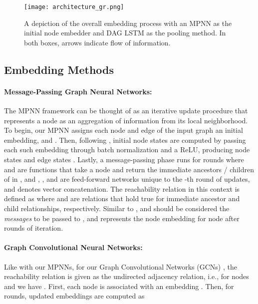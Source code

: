 \documentclass{article}
\begin{document}
\begin{figure*}
\centering
\texttt{[image: architecture\_gr.png]}
\caption{A depiction of the overall embedding process with an MPNN as the initial node embedder and DAG LSTM as the pooling method. In both boxes, arrows indicate flow of information. }
\label{fig:architecture}
\vspace{-0.1in}
\end{figure*}



\subsection{ Embedding Methods}
\label{sec:local_embedders}
\paragraph{Message-Passing Graph Neural Networks:} The MPNN framework can be thought of as an iterative update procedure that represents a node as an aggregation of information from its local neighborhood. 
To begin, our MPNN assigns each node  and edge  of the input graph  an initial embedding,  and . Then, following \cite{wang2017premise}, initial node states are computed by passing each such embedding through batch normalization \cite{ioffe2015batch} and a ReLU, producing node states  and edge states . Lastly, a message-passing phase runs for  rounds
where  and  are functions that take a node  and return the immediate ancestors / children of  in , and , , and  are feed-forward networks unique to the -th round of updates, and  denotes vector concatenation. The reachability relation  in this context is defined as  where  and  are relations that hold true for immediate ancestor and child relationships, respectively.
Similar to \cite{gilmer2017neural},  and  should be considered the \textit{messages} to be passed to , and  represents the node embedding for node  after  rounds of iteration.

\paragraph{Graph Convolutional Neural Networks: } Like with our MPNNs, for our Graph Convolutional Networks (GCNs) \cite{kipf2016semi}, the reachability relation  is given as the undirected adjacency relation, i.e., for nodes  and  we have . First, each node  is associated with an embedding . Then, for  rounds, updated embeddings are computed as
\end{document}
